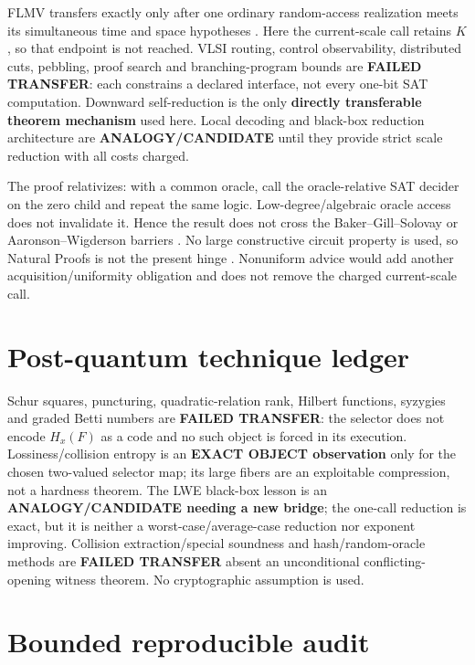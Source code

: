 \documentclass[11pt]{article}
\begin{document}
FLMV transfers exactly only after one ordinary random-access realization
meets its simultaneous time and space hypotheses \cite{flmv}.  Here the
current-scale call retains $K$, so that endpoint is not reached.  VLSI
routing, control observability, distributed cuts, pebbling, proof search and
branching-program bounds are \textbf{FAILED TRANSFER}: each constrains a
declared interface, not every one-bit SAT computation.  Downward
self-reduction is the only \textbf{directly transferable theorem mechanism}
used here.  Local decoding and black-box reduction architecture are
\textbf{ANALOGY/CANDIDATE} until they provide strict scale reduction with all
costs charged.

The proof relativizes: with a common oracle, call the oracle-relative SAT
decider on the zero child and repeat the same logic.  Low-degree/algebraic
oracle access does not invalidate it.  Hence the result does not cross the
Baker--Gill--Solovay or Aaronson--Wigderson barriers \cite{bgs,aw}.  No large
constructive circuit property is used, so Natural Proofs is not the present
hinge \cite{rr}.  Nonuniform advice would add another acquisition/uniformity
obligation and does not remove the charged current-scale call.

\section{Post-quantum technique ledger}

Schur squares, puncturing, quadratic-relation rank, Hilbert functions,
syzygies and graded Betti numbers are \textbf{FAILED TRANSFER}: the selector
does not encode $H_x(F)$ as a code and no such object is forced in its
execution.  Lossiness/collision entropy is an \textbf{EXACT OBJECT
observation} only for the chosen two-valued selector map; its large fibers are
an exploitable compression, not a hardness theorem.  The LWE black-box lesson
is an \textbf{ANALOGY/CANDIDATE needing a new bridge}; the one-call reduction
is exact, but it is neither a worst-case/average-case reduction nor exponent
improving.  Collision extraction/special soundness and hash/random-oracle
methods are \textbf{FAILED TRANSFER} absent an unconditional conflicting-
opening witness theorem.  No cryptographic assumption is used.

\section{Bounded reproducible audit}
\end{document}
